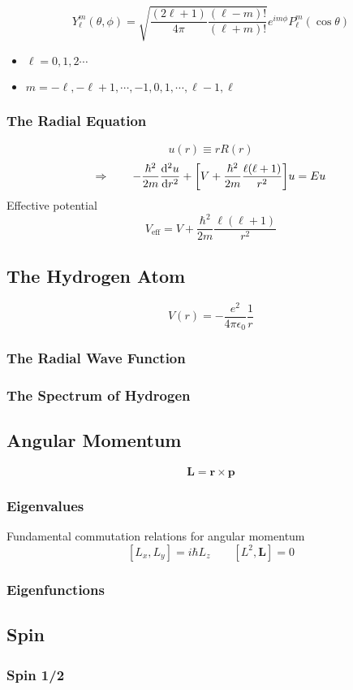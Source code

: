 \documentclass[a4paper,12pt]{article}
\begin{document}
$${ \boxed{   Y_\ell^m(\theta,\phi) = \sqrt{ \frac{(2\ell+1)}{4\pi}\frac{(\ell-m)!}{(\ell+m)!} } e^{im\phi}P^m_\ell(\cos\theta) }  }$$

\begin{itemize}
       \item \(\ell = 0,1,2\cdots\)
       \item \(m = -\ell,-\ell+1,\cdots,-1,0,1,\cdots,\ell-1,\ell\)
\end{itemize}
\subsubsection{The Radial Equation}
\[u(r) \equiv rR(r)\]
\[\Rightarrow\qquad
  -\frac{\hbar^2}{2m}\dv[2]{u}{r}+\qty[V+\frac{\hbar^2}{2m}\frac{\ell(\ell+1)}{r^2}]u = Eu\]
Effective potential
\[V_{\text{eff}} = V+\frac{\hbar^2}{2m}\frac{\ell(\ell+1)}{r^2}\]

\subsection{The Hydrogen Atom}
\[V(r) = -\frac{e^2}{4\pi\epsilon_0}\frac{1}{r}\]
\subsubsection{The Radial Wave Function}
\subsubsection{The Spectrum of Hydrogen}
\subsection{Angular Momentum}
\[\mathbf{L} = \mathbf{r}\times\mathbf{p}\]
\subsubsection{Eigenvalues}
Fundamental commutation relations for angular momentum
\[[L_x,L_y] = i\hbar L_z\qquad [L^2,\mathbf{L} ]= 0\]
\subsubsection{Eigenfunctions}

\subsection{Spin}
\subsubsection{Spin 1/2}
\end{document}
